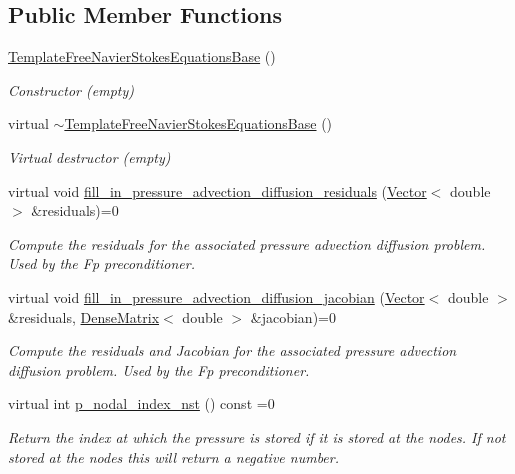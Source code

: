 \subsection*{Public Member Functions}
\begin{DoxyCompactItemize}
\item 
\hyperlink{classoomph_1_1TemplateFreeNavierStokesEquationsBase_a1c8c069403d098e399903ecdd72302f9}{Template\+Free\+Navier\+Stokes\+Equations\+Base} ()
\begin{DoxyCompactList}\small\item\em Constructor (empty) \end{DoxyCompactList}\item 
virtual \hyperlink{classoomph_1_1TemplateFreeNavierStokesEquationsBase_a43ed4e136aa68a4ea6cf9bef6347b10d}{$\sim$\+Template\+Free\+Navier\+Stokes\+Equations\+Base} ()
\begin{DoxyCompactList}\small\item\em Virtual destructor (empty) \end{DoxyCompactList}\item 
virtual void \hyperlink{classoomph_1_1TemplateFreeNavierStokesEquationsBase_ac3999c54eb656e922d7ec2f7506f18be}{fill\+\_\+in\+\_\+pressure\+\_\+advection\+\_\+diffusion\+\_\+residuals} (\hyperlink{classoomph_1_1Vector}{Vector}$<$ double $>$ \&residuals)=0
\begin{DoxyCompactList}\small\item\em Compute the residuals for the associated pressure advection diffusion problem. Used by the Fp preconditioner. \end{DoxyCompactList}\item 
virtual void \hyperlink{classoomph_1_1TemplateFreeNavierStokesEquationsBase_a5ce6cf1b23a079c7b8658b13f5b62c08}{fill\+\_\+in\+\_\+pressure\+\_\+advection\+\_\+diffusion\+\_\+jacobian} (\hyperlink{classoomph_1_1Vector}{Vector}$<$ double $>$ \&residuals, \hyperlink{classoomph_1_1DenseMatrix}{Dense\+Matrix}$<$ double $>$ \&jacobian)=0
\begin{DoxyCompactList}\small\item\em Compute the residuals and Jacobian for the associated pressure advection diffusion problem. Used by the Fp preconditioner. \end{DoxyCompactList}\item 
virtual int \hyperlink{classoomph_1_1TemplateFreeNavierStokesEquationsBase_a58c5bba4a2cef9dc6cb0835104ef1c06}{p\+\_\+nodal\+\_\+index\+\_\+nst} () const =0
\begin{DoxyCompactList}\small\item\em Return the index at which the pressure is stored if it is stored at the nodes. If not stored at the nodes this will return a negative number. \end{DoxyCompactList}\item 

\end{DoxyCompactItemize}
